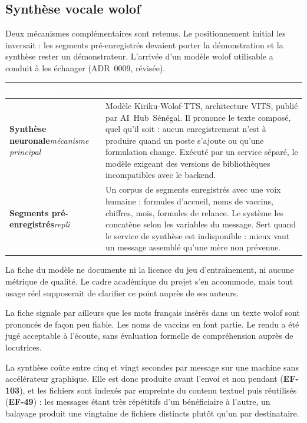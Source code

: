 \documentclass[11pt,a4paper]{article}
\newcommand{\rid}[1]{{\sffamily\bfseries\footnotesize\color{primary}#1}}
\newcommand{\hd}[1]{\textcolor{white}{\sffamily\bfseries\small #1}}
\newcommand{\rowhead}{\rowcolor{primary}}
\begin{document}
\subsection{Synthèse vocale wolof}

Deux mécanismes complémentaires sont retenus. Le positionnement initial les
inversait : les segments pré-enregistrés devaient porter la démonstration et
la synthèse rester un démonstrateur. L'arrivée d'un modèle wolof utilisable a
conduit à les échanger (ADR~0009, révisée).

\vspace{2mm}
\noindent
\begin{tabularx}{\textwidth}{@{}R{4.2cm} L@{}}
\toprule
\rowhead \hd{Mécanisme} & \hd{Description et positionnement} \\
\midrule
\textbf{Synthèse neuronale}\newline\textit{mécanisme principal}
  & Modèle Kiriku-Wolof-TTS, architecture VITS, publié par AI~Hub~Sénégal. Il prononce le texte composé, quel qu'il soit : aucun enregistrement n'est à produire quand un poste s'ajoute ou qu'une formulation change. Exécuté par un service séparé, le modèle exigeant des versions de bibliothèques incompatibles avec le backend. \\
\textbf{Segments pré-enregistrés}\newline\textit{repli}
  & Un corpus de segments enregistrés avec une voix humaine : formules d'accueil, noms de vaccins, chiffres, mois, formules de relance. Le système les concatène selon les variables du message. Sert quand le service de synthèse est indisponible : mieux vaut un message assemblé qu'une mère non prévenue. \\
\bottomrule
\end{tabularx}

\begin{vigilance}
La fiche du modèle ne documente ni la licence du jeu d'entraînement, ni aucune
métrique de qualité. Le cadre académique du projet s'en accommode, mais tout
usage réel supposerait de clarifier ce point auprès de ses auteurs.

La fiche signale par ailleurs que les mots français insérés dans un texte wolof
sont prononcés de façon peu fiable. Les noms de vaccins en font partie. Le rendu
a été jugé acceptable à l'écoute, sans évaluation formelle de compréhension
auprès de locutrices.
\end{vigilance}

La synthèse coûte entre cinq et vingt secondes par message sur une machine sans
accélérateur graphique. Elle est donc produite avant l'envoi et non pendant
(\rid{EF-103}), et les fichiers sont indexés par empreinte du contenu textuel
puis réutilisés (\rid{EF-49}) : les messages étant très répétitifs d'un
bénéficiaire à l'autre, un balayage produit une vingtaine de fichiers distincts
plutôt qu'un par destinataire.
\end{document}
